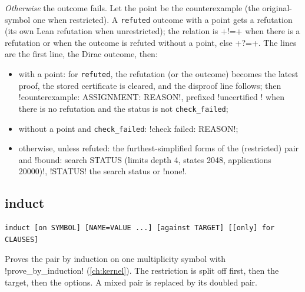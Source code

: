 \emph{Otherwise} the outcome fails. Let the point be the counterexample (the original-symbol one when restricted). A \texttt{refuted} outcome with a point gets a refutation (its own Lean refutation when unrestricted); the relation is \code+!=+ when there is a refutation or when the outcome is refuted without a point, else \code+?=+. The lines are the first line, the Dirac outcome, then:
\begin{itemize}
\item with a point: for \texttt{refuted}, the refutation (or the outcome) becomes the latest proof, the stored certificate is cleared, and the disproof line follows; then \code!counterexample: ASSIGNMENT: REASON!, prefixed \code!uncertified ! when there is no refutation and the status is not \texttt{check\_failed};
\item without a point and \texttt{check\_failed}: \code!check failed: REASON!;
\item otherwise, unless refuted: the furthest-simplified forms of the (restricted) pair and \code!bound: search STATUS (limits depth 4, states 2048, applications 20000)!, \code!STATUS! the search status or \code!none!.
\end{itemize}

\subsection{induct}\label{sec:language-induct}

\begin{lstlisting}[style=azx]
induct [on SYMBOL] [NAME=VALUE ...] [against TARGET] [[only] for CLAUSES]
\end{lstlisting}
Proves the pair by induction on one multiplicity symbol with \py!prove_by_induction! (\cref{ch:kernel}). The restriction is split off first, then the target, then the options. A mixed pair is replaced by its doubled pair.

